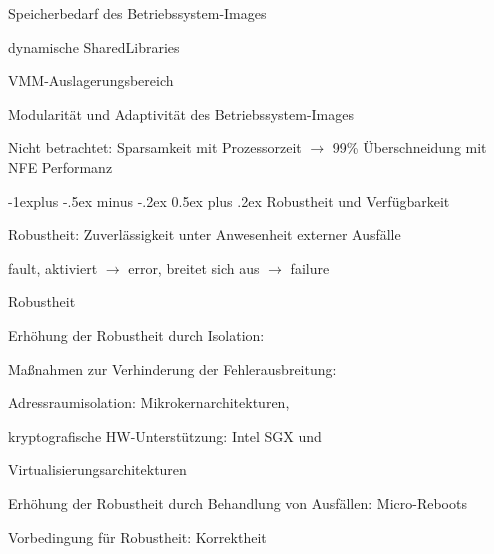 \documentclass[a4paper]{article}
\makeatletter
\renewcommand{\subsection}{\@startsection{subsection}{2}{0mm}%
 {-1explus -.5ex minus -.2ex}%
 {0.5ex plus .2ex}%
 {\normalfont\normalsize\bfseries}}
\makeatother
\begin{document}
\begin{multicols}{3}
\begin{itemize*}
\begin{enumerate*}
            \item Speicherbedarf des Betriebssystem-Images
            \item dynamische SharedLibraries
            \item VMM-Auslagerungsbereich
            \item Modularität und Adaptivität des Betriebssystem-Images
        \end{enumerate*}
        \item
        Nicht betrachtet: Sparsamkeit mit Prozessorzeit
        $\rightarrow$ 99\% Überschneidung mit NFE Performanz
    \end{itemize*}


    \subsection{Robustheit und
        Verfügbarkeit}

    \begin{itemize*}
        \item
        Robustheit: Zuverlässigkeit unter Anwesenheit externer Ausfälle
        \item
        fault, aktiviert $\rightarrow$ error, breitet sich aus
        $\rightarrow$ failure
    \end{itemize*}

    Robustheit

    \begin{itemize*}
        \item
        Erhöhung der Robustheit durch Isolation:
        \begin{itemize*}
            \item Maßnahmen zur Verhinderung der Fehlerausbreitung:
        \end{itemize*}
        \begin{enumerate*}

            \item Adressraumisolation: Mikrokernarchitekturen,
            \item kryptografische HW-Unterstützung: Intel SGX und
            \item Virtualisierungsarchitekturen
        \end{enumerate*}
        \item
        Erhöhung der Robustheit durch Behandlung von Ausfällen: Micro-Reboots
    \end{itemize*}

    Vorbedingung für Robustheit: Korrektheit


\end{multicols}
\end{document}
